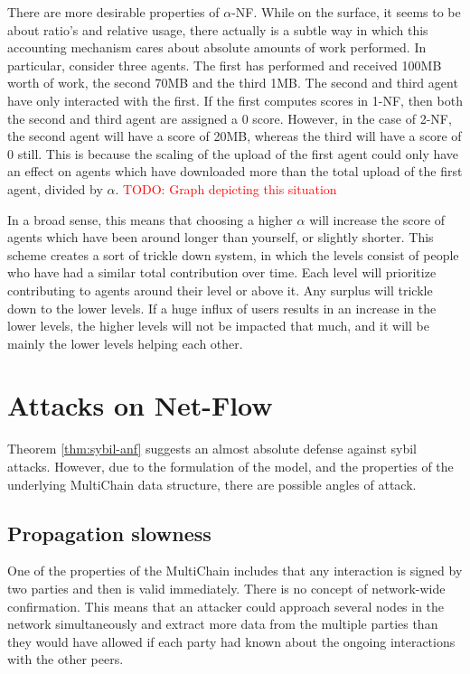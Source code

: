 \documentclass[a4paper,11pt]{book}
\newcommand\musthave[1]{\textcolor{red}{TODO: #1}}
\theoremstyle{definition}
\begin{document}
There are more desirable properties of $\alpha$-NF. While on the surface, it seems to
be about ratio's and relative usage, there actually is a subtle way in which
this accounting mechanism cares about absolute amounts of work performed. 
In particular, consider three agents. The first has performed and received
100MB worth of work, the second 70MB and the third 1MB. The second and third
agent have only interacted with the first. If the first computes scores
in 1-NF, then both the second and third agent are assigned a 0 score.
However, in the case of 2-NF, the second agent will have a score of 20MB,
whereas the third will have a score of 0 still. This is because the scaling
of the upload of the first agent could only have an effect on agents which
have downloaded more than the total upload of the first agent, divided
by $\alpha$. 
\musthave{Graph depicting this situation}

In a broad sense, this means that choosing a higher $\alpha$ will increase the score 
of agents which have been around longer than yourself, or slightly shorter. This
scheme creates a sort of trickle down system, in which the levels consist of people
who have had a similar total contribution over time. Each level will prioritize
contributing to agents around their level or above it. Any surplus will trickle down
to the lower levels. If a huge influx of users results in an increase in the lower
levels, the higher levels will not be impacted that much, and it will be mainly the
lower levels helping each other.


\section{Attacks on Net-Flow}

Theorem \ref{thm:sybil-anf} suggests an almost absolute defense against sybil attacks. However,
due to the formulation of the model, and the properties of the underlying MultiChain data structure,
there are possible angles of attack.

\subsection{Propagation slowness}

One of the properties of the MultiChain includes that any interaction is signed by two parties and
then is valid immediately. There is no concept of network-wide confirmation. This means that an attacker
could approach several nodes in the network simultaneously and extract more data from the multiple parties
than they would have allowed if each party had known about the ongoing interactions with the other peers.
\end{document}
